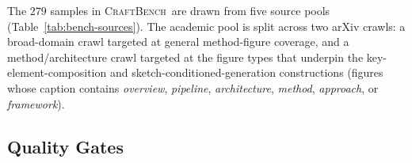 \documentclass{llmxive}
\providecommand{\CrafterBench}{\textsc{CraftBench}\xspace}
\begin{document}
The $279$ samples in \CrafterBench\ are drawn from five source pools (Table~\ref{tab:bench-sources}). The academic pool is split across two arXiv crawls: a broad-domain crawl targeted at general method-figure coverage, and a method/architecture crawl targeted at the figure types that underpin the key-element-composition and sketch-conditioned-generation constructions (figures whose caption contains \textit{overview}, \textit{pipeline}, \textit{architecture}, \textit{method}, \textit{approach}, or \textit{framework}).

\begin{table}[!htbp]
\centering
{}
\caption{Source pools feeding \CrafterBench. Each surviving sample passes the seven-stage quality pipeline of Appendix~\ref{app:bench-qc}; NeurIPS spotlight + oral posters were also crawled but none survived the gates.}
\label{tab:bench-sources}
\end{table}

\subsection{Quality Gates}
\label{app:bench-qc}
\end{document}
